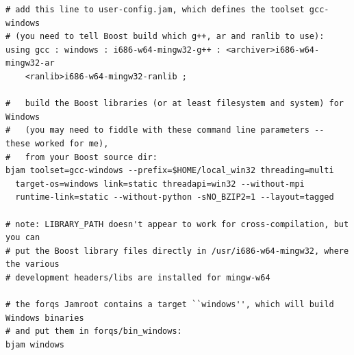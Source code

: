 \documentclass{article}
\begin{document}
\begin{footnotesize}
\begin{verbatim}
# add this line to user-config.jam, which defines the toolset gcc-windows
# (you need to tell Boost build which g++, ar and ranlib to use):
using gcc : windows : i686-w64-mingw32-g++ : <archiver>i686-w64-mingw32-ar 
    <ranlib>i686-w64-mingw32-ranlib ;

#   build the Boost libraries (or at least filesystem and system) for Windows
#   (you may need to fiddle with these command line parameters -- these worked for me),
#   from your Boost source dir:
bjam toolset=gcc-windows --prefix=$HOME/local_win32 threading=multi  
  target-os=windows link=static threadapi=win32 --without-mpi 
  runtime-link=static --without-python -sNO_BZIP2=1 --layout=tagged

# note: LIBRARY_PATH doesn't appear to work for cross-compilation, but you can
# put the Boost library files directly in /usr/i686-w64-mingw32, where the various
# development headers/libs are installed for mingw-w64

# the forqs Jamroot contains a target ``windows'', which will build Windows binaries
# and put them in forqs/bin_windows:
bjam windows


\end{verbatim}
\end{footnotesize}




%
%




\end{document}
